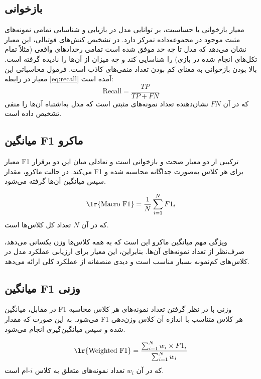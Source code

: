 \documentclass[12pt]{report}
\begin{document}
\subsection[بازخوانی]{بازخوانی}
معیار بازخوانی یا حساسیت، بر توانایی مدل در بازیابی و شناسایی تمامی نمونه‌های مثبت موجود در مجموعه‌داده تمرکز دارد. در تشخیص کنش‌های فوتبالی، این معیار نشان می‌دهد که مدل تا چه حد موفق شده است تمامی رخدادهای واقعی (مثلاً تمام تکل‌های انجام شده در بازی) را شناسایی کند و چه میزان از آن‌ها را نادیده گرفته است. بالا بودن بازخوانی به معنای کم بودن تعداد منفی‌های کاذب است. فرمول محاسباتی این معیار در رابطه \ref{eq:recall} آمده است:
\begin{equation}\label{eq:recall}
\text{Recall} = \frac{TP}{TP + FN}
\end{equation}
که در آن $FN$ نشان‌دهنده تعداد نمونه‌های مثبتی است که مدل به‌اشتباه آن‌ها را منفی تشخیص داده است.

\subsection[میانگین F1 ماکرو]{میانگین F1 ماکرو}
معیار F1 ترکیبی از دو معیار صحت و بازخوانی است و تعادلی میان این دو برقرار می‌کند. در حالت ماکرو، مقدار F1 برای هر کلاس به‌صورت جداگانه محاسبه شده و سپس میانگین آن‌ها گرفته می‌شود.

\begin{equation}
\text{\lr{Macro F1}} = \frac{1}{N} \sum_{i=1}^{N} F1_i
\end{equation}
که در آن $N$ تعداد کل کلاس‌ها است.

ویژگی مهم میانگین ماکرو این است که به همه کلاس‌ها وزن یکسانی می‌دهد، صرف‌نظر از تعداد نمونه‌های آن‌ها. بنابراین، این معیار برای ارزیابی عملکرد مدل در کلاس‌های کم‌نمونه بسیار مناسب است و دیدی منصفانه از عملکرد کلی ارائه می‌دهد.

\subsection[میانگین F1 وزنی]{میانگین F1 وزنی}
در مقابل، میانگین F1 وزنی با در نظر گرفتن تعداد نمونه‌های هر کلاس محاسبه می‌شود. به این صورت که مقدار F1 هر کلاس متناسب با اندازه آن کلاس وزن‌دهی شده و سپس میانگین‌گیری انجام می‌شود.

\begin{equation}
\text{\lr{Weighted F1}} = \frac{\sum_{i=1}^{N} w_i \times F1_i}{\sum_{i=1}^{N} w_i}
\end{equation}
که در آن $w_i$ تعداد نمونه‌های متعلق به کلاس $i$-ام است.
\end{document}
